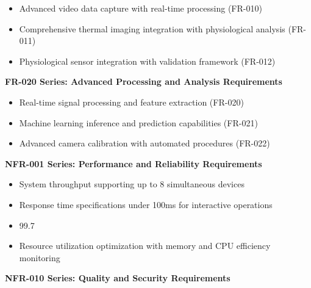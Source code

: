\documentclass[12pt,a4paper]{report}
\begin{document}
\begin{itemize}
\item Advanced video data capture with real-time processing (FR-010)
\item Comprehensive thermal imaging integration with physiological analysis (FR-011)
\item Physiological sensor integration with validation framework (FR-012)

\end{itemize}
\textbf{FR-020 Series: Advanced Processing and Analysis Requirements}

\begin{itemize}
\item Real-time signal processing and feature extraction (FR-020)
\item Machine learning inference and prediction capabilities (FR-021)
\item Advanced camera calibration with automated procedures (FR-022)

\end{itemize}
\textbf{NFR-001 Series: Performance and Reliability Requirements}

\begin{itemize}
\item System throughput supporting up to 8 simultaneous devices
\item Response time specifications under 100ms for interactive operations
\item 99.7%
\item Resource utilization optimization with memory and CPU efficiency monitoring

\end{itemize}
\textbf{NFR-010 Series: Quality and Security Requirements}
\end{document}
